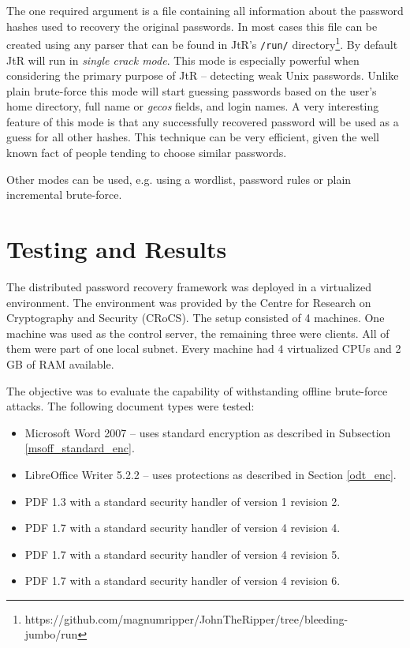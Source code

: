 \documentclass[11pt,oneside]{fithesis2}
\begin{document}
The one required argument is a file containing all information about the password hashes used to recovery the original passwords. In most cases this file can be created using any parser that can be found in JtR's \texttt{/run/} directory\footnote{https://github.com/magnumripper/JohnTheRipper/tree/bleeding-jumbo/run}. By default JtR will run in \textit{single crack mode}. This mode is especially powerful when considering the primary purpose of JtR -- detecting weak Unix passwords. Unlike plain brute-force this mode will start guessing passwords based on the user's home directory, full name or \textit{gecos} fields, and login names. A very interesting feature of this mode is that any successfully recovered password will be used as a guess for all other hashes. This technique can be very efficient, given the well known fact of  people tending to choose similar passwords.

Other modes can be used, e.g. using a wordlist, password rules or plain incremental brute-force. 
  
\section{Testing and Results}

The distributed password recovery framework was deployed in a virtualized environment. The environment was provided by the Centre for Research on Cryptography and Security (CRoCS). The setup consisted of 4 machines. One machine was used as the control server, the remaining three were clients. All of them were part of one local subnet. Every machine had 4 virtualized CPUs and 2 GB of RAM available. 

The objective was to evaluate the capability of withstanding offline brute-force attacks. The following document types were tested:

\begin{itemize}
\setlength\itemsep{0.1em}
	\item{Microsoft Word 2007 -- uses standard encryption as described in Subsection \ref{msoff_standard_enc}.}
	\item{LibreOffice Writer 5.2.2 -- uses protections as described in Section \ref{odt_enc}.}
	\item{PDF 1.3 with a standard security handler of version 1 revision 2.}
	\item{PDF 1.7 with a standard security handler of version 4 revision 4.}	
	\item{PDF 1.7 with a standard security handler of version 4 revision 5.}	
	\item{PDF 1.7 with a standard security handler of version 4 revision 6.}	
\end{itemize}
\end{document}
